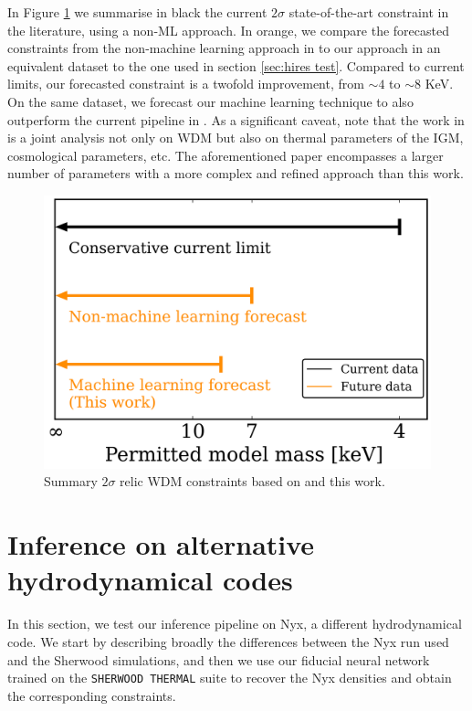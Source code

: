 In Figure \ref{fig: wdm constraints summary} we summarise in black the current $2\sigma$ state-of-the-art constraint in the literature, using a non-ML approach. In orange, we compare the forecasted constraints from the non-machine learning approach in \cite{sherwood_wdm} to our approach in an equivalent dataset to the one used in section \ref{sec:hires test}. Compared to current limits, our forecasted constraint is a twofold improvement, from $\sim 4$ to $\sim 8$ KeV. On the same dataset, we forecast our machine learning technique to also outperform the current pipeline in \cite{sherwood_wdm}. As a significant caveat, note that the work in \cite{sherwood_wdm} is a joint analysis not only on WDM but also on thermal parameters of the IGM, cosmological parameters, etc. The aforementioned paper encompasses a larger number of parameters with a more complex and refined approach than this work.


\begin{figure}
    \centering
    \includegraphics[width=0.6\linewidth]{img/ML/limits_summary.png}
    \caption{Summary $2\sigma$ relic WDM constraints based on \cite{sherwood_wdm} and this work.}
    \label{fig: wdm constraints summary}
\end{figure}













\section{Inference on alternative hydrodynamical codes}
In this section, we test our inference pipeline on Nyx, a different hydrodynamical code. We start by describing broadly the differences between the Nyx run used and the Sherwood simulations, and then we use our fiducial neural network trained on the \texttt{SHERWOOD THERMAL} suite to recover the Nyx densities and obtain the corresponding constraints.


